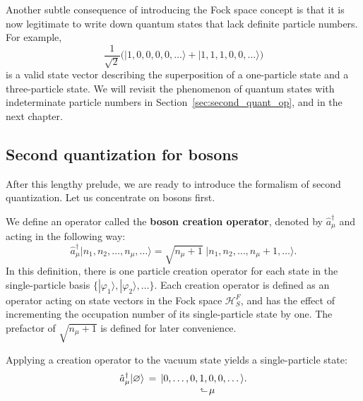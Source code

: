 \documentclass[pra,12pt]{revtex4}
\begin{document}
Another subtle consequence of introducing the Fock space concept is
that it is now legitimate to write down quantum states that lack
definite particle numbers.  For example,
\begin{equation*}
  \frac{1}{\sqrt{2}} \Big(|1,0,0,0,0,\dots\rangle + |1,1,1,0,0,\dots\rangle\Big)
\end{equation*}
is a valid state vector describing the superposition of a one-particle
state and a three-particle state.  We will revisit the phenomenon of
quantum states with indeterminate particle numbers in
Section~\ref{sec:second_quant_op}, and in the next chapter.

\subsection{Second quantization for bosons}
\label{sec:second_quantized_bosons}

After this lengthy prelude, we are ready to introduce the formalism of
second quantization.  Let us concentrate on bosons first.  

We define an operator called the \textbf{boson creation operator},
denoted by $\hat{a}_\mu^\dagger$ and acting in the following way:
\begin{equation}
  \hat{a}_\mu^\dagger \big|n_1, n_2, \dots, n_\mu, \dots\big\rangle = \sqrt{n_\mu+1} \; \big|n_1, n_2, \dots, n_\mu + 1, \dots\big\rangle.
  \label{amu}
\end{equation}
In this definition, there is one particle creation operator for each
state in the single-particle basis
$\{|\varphi_1\rangle,|\varphi_2\rangle,\dots\}$.  Each creation operator is
defined as an operator acting on state vectors in the Fock space
$\mathscr{H}^F_S$, and has the effect of incrementing the occupation
number of its single-particle state by one.  The prefactor of
$\sqrt{n_\mu+1}$ is defined for later convenience.

Applying a creation operator to the vacuum state yields a
single-particle state:
\begin{align}
  \begin{aligned}\hat{a}_\mu^\dagger |\varnothing\rangle \, &= \, |0,\dots,0, 1, 0, 0, \dots\rangle. \\[-1ex] &\qquad\qquad\quad\;\;\rotatebox[origin=c]{90}{$\Rsh$}\,\mu
  \end{aligned}
\end{align}
\end{document}
